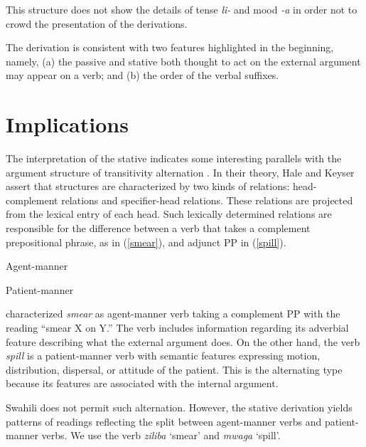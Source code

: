 \documentclass[output=paper]{langscibook}
\begin{document}
This structure does not show the details of tense \textit{li-} and mood \textit{-a} in order not to crowd the presentation of the derivations. 

The derivation is consistent with two features highlighted in the beginning, namely, (a) the passive and stative both thought to act on the external argument may appear on a verb; and (b) the order of the verbal suffixes.  

\section{Implications}
The interpretation of the stative indicates some interesting parallels with the argument structure of transitivity alternation \citep{Hale:2002aa}. In their theory, Hale and Keyser assert that structures are characterized by two kinds of relations: head-complement relations and specifier-head relations. These relations are projected from the lexical entry of each head. Such lexically determined relations are responsible for the difference between a verb that takes a complement prepositional phrase, as in (\ref{smear}), and adjunct PP in (\ref{spill}).\largerpage

\begin{exe}
\ex\label{smear}Agent-manner
\begin{xlist}
\end{xlist}
\ex\label{spill}Patient-manner
\begin{xlist}
\end{xlist}
\end{exe}
\citet{Hale:2002aa} characterized \textit{smear} as agent-manner verb taking a complement PP with the reading ``smear X on Y.'' The verb includes information regarding its adverbial feature describing what the external argument does. On the other hand, the verb \textit{spill} is a patient-manner verb with semantic features expressing motion, distribution, dispersal, or attitude of the patient. This is the alternating type because its features are associated with the internal argument. 

\begin{sloppypar}
Swahili does not permit such alternation. However, the stative derivation yields patterns of readings reflecting the split between agent-manner verbs and patient-manner verbs. We use the verb \textit{ziliba} `smear' and \textit{mwaga} `spill'. 
\end{sloppypar}
\end{document}
